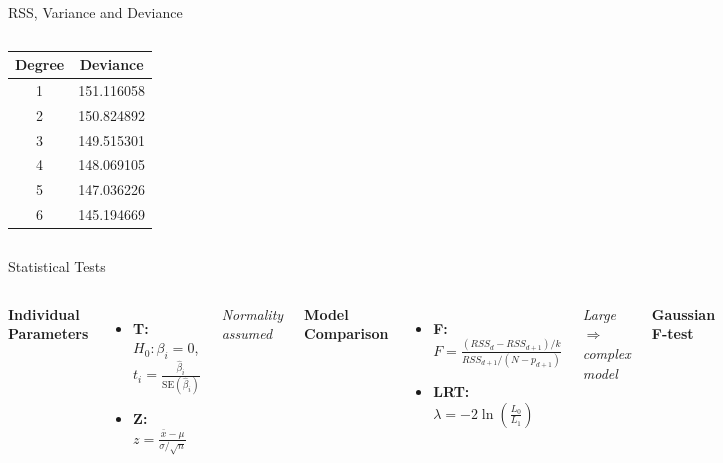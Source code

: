 \documentclass[aspectratio=169]{beamer}
\begin{document}
\begin{frame}{RSS, Variance and Deviance}
\begin{columns}
{\begin{tabular}{cc}
\hline
 \textbf{Degree}&\textbf{Deviance} \\
\hline
 1&151.116058 \\
 2&150.824892 \\
 3&149.515301 \\
 4&148.069105 \\
 5&147.036226 \\
 6&145.194669 \\
\hline
\end{tabular}
}

\end{columns}
\end{frame}


\begin{frame}{Statistical Tests}
\small

\begin{columns}[T]


\textbf{Individual Parameters}
\vspace{0.1cm}
\begin{itemize}
    \item \textbf{T:} $H_0:\beta_i=0$, \quad 
    $t_i=\frac{\hat{\beta}_i}{\text{SE}(\hat{\beta}_i)}$
    
    \item \textbf{Z:} 
    $z=\frac{\bar{x}-\mu}{\sigma/\sqrt{n}}$
\end{itemize}

\vspace{0.2cm}
\textit{Normality assumed}

\vspace{0.4cm}

\textbf{Model Comparison}
\vspace{0.1cm}
\begin{itemize}
    \item \textbf{F:} 
    $F=\frac{(RSS_d-RSS_{d+1})/k}{RSS_{d+1}/(N-p_{d+1})}$
    
    \item \textbf{LRT:} 
    $\lambda=-2\ln\!\left(\frac{L_0}{L_1}\right)$
\end{itemize}

\vspace{0.2cm}
\textit{Large $\Rightarrow$ complex model}

\scriptsize

\textbf{Gaussian F-test}
\vspace{0.1cm}


\end{columns}
\end{frame}
\end{document}
